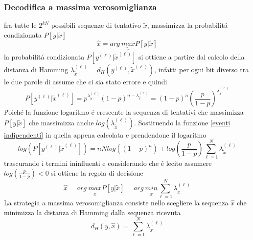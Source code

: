         \subsubsection{Decodifica a massima verosomiglianza}
            fra tutte le $2^{kN}$ possibili sequenze di tentativo $\tilde{x}$, massimizza la probabilitá 
            condizionata $P[y|\tilde{x}]$
            \[
                \hat{x} = arg\ \underset{\tilde{x}}{max}P[y|\tilde{x}]   
            \]
            la probabilitá condizionata $P\left[y^{(\ell)}|\tilde{x}^{(\ell)}\right]$ si ottiene a partire dal calcolo della distanza di Hamming 
            $\lambda^{(\ell)}_{\tilde{x}} = d_H(y^{(\ell)},\tilde{x}^{(\ell)})$, infatti per ogni bit diverso tra le due parole di assume che ci sia stato errore e quindi 
            \[
                P\left[y^{(\ell)}|\tilde{x}^{(\ell)}\right] = p^{\lambda^{(\ell)}_{\tilde{x}}}(1-p)^{n-\lambda^{(\ell)}_{\tilde{x}}} = (1-p)^n\left(\frac{p}{1-p}\right)^{\lambda^{(\ell)}_{\tilde{x}}}
            \]
            Poiché la funzione logaritmo é crescente la sequenza di tentativi che massimizza $P[y|\tilde{x}]$ che massimizza anche $log\left(\lambda^{(\ell)}_{\tilde{x}}\right)$.
            Sostituendo la funzione \ref{eventi indipendenti} in quella appena calcolata e prendendone il logaritmo
            \[
                log\left(P\left[y^{(\ell)}|\tilde{x}^{(\ell)}\right]\right) =nNlog \left((1-p)^n\right) + log\left(\frac{p}{1-p}\right)\sum_{\ell=1}^{N}\lambda^{(\ell)}_{\tilde{x}}
            \]
            trascurando i termini ininfluenti e considerando che é lecito assumere $log\left(\frac{p}{1-p}\right)<0$ si ottiene la regola di decisione 
            \[
                \hat{x} = arg\ \underset{\tilde{x}}{max}P[y|\tilde{x}] = arg\ \underset{\tilde{x}}{min}\sum_{\ell=1}^{N}\lambda^{(\ell)}_{\tilde{x}}
            \]
            La strategia a massima verosomiglianza consiste nello scegliere la sequenza $\hat{x}$ che minimizza la distanza di Hamming dalla sequenza 
            ricevuta 
            \[
                d_H(y,\hat{x}) = \sum_{\ell=1}^{N}\lambda^{(\ell)}_{\tilde{x}}
            \]
